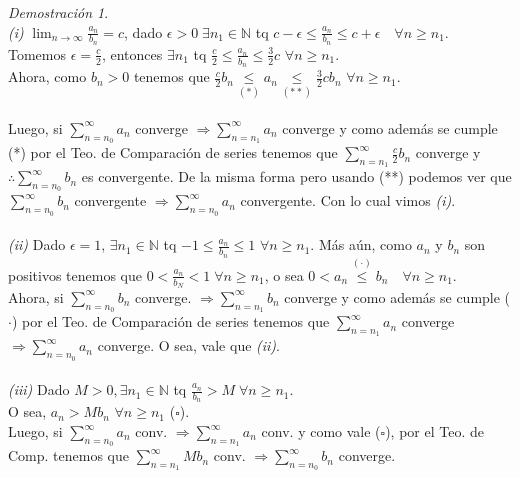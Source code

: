 \documentclass{article}
\theoremstyle{definition}
\theoremstyle{definition}
\theoremstyle{remark}
\newtheorem*{demo}{Demostración}
\begin{document}
\begin{demo} \; \\
  \emph{(i)} \quad $\lim_{n\to\infty}{\frac{a_n}{b_n}}=c$, dado $\epsilon > 0 \; \exists n_1 \in \mathbb{N}$ tq $c-\epsilon \leq \frac{a_n}{b_n} \leq c+\epsilon \quad \forall n \geq n_1$. \\ 
  Tomemos $\epsilon = \frac{c}{2}$, entonces $\exists n_1$ tq $\frac{c}{2} \leq \frac{a_n}{b_n} \leq \frac{3}{2}c$ \quad $\forall n \geq n_1$.\\ Ahora, como $b_n >0$ tenemos que $\frac{c}{2}b_n \underset{(*)}{\leq}a_n \underset{(**)}{\leq} \frac{3}{2} c b_n$ \quad $\forall n \geq n_1$. \\\\
  Luego, si $\sum_{n=n_0}^{\infty}{a_n}$ converge $\Rightarrow \sum_{n=n_1}^{\infty}{a_n}$ converge y como además se cumple (*) por el Teo. de Comparación de series tenemos que $\sum_{n=n_1}^{\infty}{\frac{c}{2}b_n}$ converge y $\therefore \sum_{n=n_0}^{\infty}{b_n}$ es convergente. De la misma forma pero usando (**) podemos ver que \\ 
  $\sum_{n=n_0}^{\infty}{b_n}$ convergente $\Rightarrow \sum_{n=n_0}^{\infty}{a_n}$ convergente. 
Con lo cual vimos \emph{(i)}. \\ \\
\emph{(ii)} Dado $\epsilon=1$, $\exists n_1 \in \mathbb{N}$ tq $-1 \leq \frac{a_n}{b_n} \leq 1$ \; $\forall n \geq n_1$. Más aún, como $a_n$ y $b_n$ son positivos tenemos que $0 < \frac{a_n}{b_N}<1 \; \forall n \geq n_1 $, o sea $0 < a_n \overset{(\cdot)}{\leq}b_n \quad \forall n \geq n_1$. \\
Ahora, si $\sum_{n=n_0}^{\infty}{b_n}$ converge. $\Rightarrow \sum_{n=n_1}^{\infty}{b_n}$ converge y como además se cumple ($\cdot$) por el Teo. de Comparación de series tenemos que $\sum_{n=n_1}^{\infty}{a_n}$ converge $\Rightarrow \sum_{n=n_0}^{\infty}{a_n}$ converge. O sea, vale que \emph{(ii)}. \\ \\ 
\emph{(iii)} Dado $M>0, \exists n_1 \in \mathbb{N}$ tq $\frac{a_n}{b_n} > M \; \forall n \geq n_1$. \\
O sea, $a_n > Mb_n $ \quad $\forall n \geq n_1$ ($\square$). \\
Luego, si $\sum_{n=n_0}^{\infty}{a_n}$ conv. $\Rightarrow \sum_{n=n_1}^{\infty}{a_n}$ conv. y como vale ($\square$), por el Teo. de Comp. tenemos que $\sum_{n=n_1}^{\infty}{Mb_n}$ conv. $\Rightarrow \sum_{n=n_0}^{\infty}{b_n}$ converge.
\end{demo}
\end{document}
